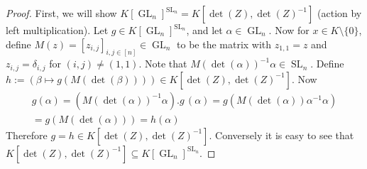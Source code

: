 \begin{proof}
  First, we will show $ K \left\lbrack \operatorname{GL}_n \right\rbrack ^{\operatorname{SL}_n} = K \left\lbrack \operatorname{det} (Z) , \operatorname{det} (Z) ^{-1} \right\rbrack $ (action by left multiplication).
  Let $g \in K \left\lbrack \operatorname{GL}_n \right\rbrack ^{ \operatorname{SL}_n }$, and let $ \alpha \in \operatorname{GL}_n $.
  Now for $x \in K \setminus \{0\}$, define $M(z) = [z_{i,j}]_{i,j \in [n]} \in \operatorname{GL}_n$ to be the matrix with $z_{1,1} = z$ and $z_{i,j} = \delta_{i,j}$ for $(i,j) \neq (1,1)$.
  Note that $M \left( \operatorname{det}(\alpha) \right)^{-1} \alpha \in \operatorname{SL}_n$.
  Define $ h := \left( \beta \mapsto g \left( M(\operatorname{det}(\beta)) \right) \right) \in K \left\lbrack \operatorname{det} (Z) , \operatorname{det} (Z) ^{-1} \right\rbrack $.
  Now
  \begin{equation}
    \begin{aligned}
      g ( \alpha )
      = \left( M \left( \operatorname{det}(\alpha) \right)^{-1} \alpha \right) . g \, (\alpha)
      = g \left( M \left( \operatorname{det}(\alpha) \right) \alpha ^{-1} \alpha \right) \\
      = g \left( M \left( \operatorname{det}(\alpha) \right) \right)
      = h (\alpha)
    \end{aligned}
  \end{equation}
  Therefore $ g = h \in K \left\lbrack \operatorname{det} (Z) , \operatorname{det} (Z) ^{-1} \right\rbrack $.
  Conversely it is easy to see that $ K \left\lbrack \operatorname{det} (Z) , \operatorname{det} (Z) ^{-1} \right\rbrack \subseteq K \left\lbrack \operatorname{GL}_n \right\rbrack ^{\operatorname{SL}_n } $.


\end{proof}
